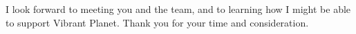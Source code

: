 I look forward to meeting you and the team, and to learning how I might be able to support Vibrant Planet.
Thank you for your time and consideration. \newline

\makeletterclosing



